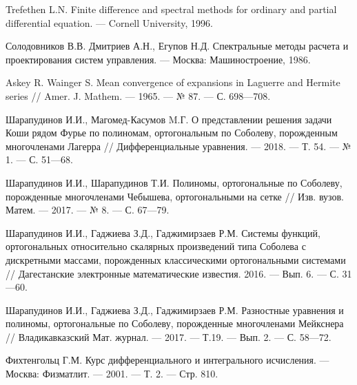\begin{thebibliography}{99}
Trefethen L.N. Finite difference and spectral methods for ordinary and partial differential equation. --- Cornell University, 1996.





Солодовников В.В. Дмитриев А.Н., Егупов Н.Д. Спектральные методы расчета и проектирования систем управления. --- Москва: Машиностроение, 1986.





Askey R. Wainger S. Mean convergence of expansions in Laguerre and Hermite series // Amer. J. Mathem. --- 1965. --- № 87. --- С. 698---708.





Шарапудинов И.И., Магомед-Касумов M.Г. О представлении решения задачи Коши  рядом Фурье  по полиномам, ортогональным по  Соболеву, порожденным многочленами Лагерра // Дифференциальные уравнения. --- 2018. --- Т. 54. --- № 1. --- С. 51---68.





Шарапудинов И.И., Шарапудинов Т.И. Полиномы, ортогональные по Соболеву, порожденные многочленами Чебышева, ортогональными на сетке // Изв. вузов. Матем. --- 2017. --- № 8. --- С. 67---79.






Шарапудинов И.И., Гаджиева З.Д., Гаджимирзаев Р.М. Системы функций, ортогональных относительно скалярных произведений типа Соболева с дискретными массами, порожденных классическими ортогональными системами // Дагестанские электронные математические известия. 2016. --- Вып. 6. --- С. 31---60.






Шарапудинов И.И., Гаджиева З.Д., Гаджимирзаев Р.М.
Разностные уравнения и полиномы, ортогональные по Соболеву, порожденные многочленами Мейкснера //
Владикавказский Мат. журнал. --- 2017. --- Т.19. --- Вып. 2. --- С. 58---72.






Фихтенгольц Г.М.
Курс дифференциального и интегрального исчисления. --- Москва: Физматлит. --- 2001. --- Т. 2. --- Стр. 810.







\end{thebibliography}
